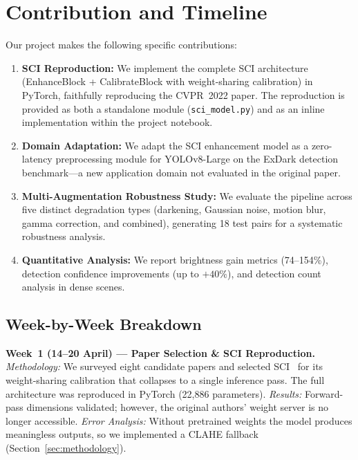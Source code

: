 \documentclass[conference]{IEEEtran}
\begin{document}
\section{Contribution and Timeline}
\label{sec:contribution}

Our project makes the following specific contributions:

\begin{enumerate}
  \item \textbf{SCI Reproduction:} We implement the complete SCI
  architecture (EnhanceBlock + CalibrateBlock with weight-sharing
  calibration) in PyTorch, faithfully reproducing the CVPR~2022 paper.
  The reproduction is provided as both a standalone module
  (\texttt{sci\_model.py}) and as an inline implementation within the
  project notebook.

  \item \textbf{Domain Adaptation:} We adapt the SCI enhancement model as
  a zero-latency preprocessing module for YOLOv8-Large on the ExDark
  detection benchmark---a new application domain not evaluated in the
  original paper.

  \item \textbf{Multi-Augmentation Robustness Study:} We evaluate the
  pipeline across five distinct degradation types (darkening, Gaussian
  noise, motion blur, gamma correction, and combined), generating 18 test
  pairs for a systematic robustness analysis.

  \item \textbf{Quantitative Analysis:} We report brightness gain metrics
  (74--154\%), detection confidence improvements (up to $+40\%$), and
  detection count analysis in dense scenes.
\end{enumerate}

\subsection{Week-by-Week Breakdown}

\textbf{Week~1 (14--20 April) --- Paper Selection \& SCI Reproduction.}
\emph{Methodology:}
We surveyed eight candidate papers and selected
SCI~\cite{ma2022sci} for its weight-sharing calibration that
collapses to a single inference pass.  The full architecture was
reproduced in PyTorch (22,886 parameters).
\emph{Results:}
Forward-pass dimensions validated; however, the original authors'
weight server is no longer accessible.
\emph{Error Analysis:}
Without pretrained weights the model produces meaningless outputs,
so we implemented a CLAHE fallback
(Section~\ref{sec:methodology}).
\end{document}
